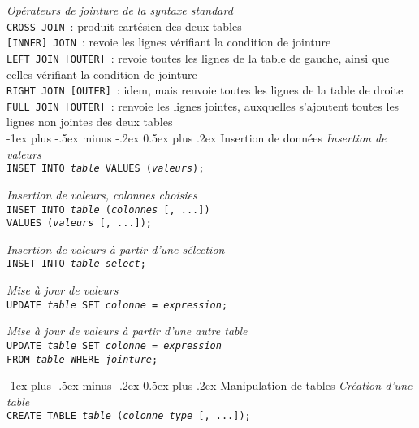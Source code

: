 \documentclass[10pt,landscape, a4paper]{article}
\makeatletter
\renewcommand{\section}{\@startsection{section}{1}{0mm}%
                                {-1ex plus -.5ex minus -.2ex}%
                                {0.5ex plus .2ex}%
                                {\normalfont\large\bfseries}}
\makeatother
\begin{document}
\begin{multicols}{3}
\hspace{0.25em} {\scriptsize \emph{Opérateurs de jointure de la syntaxe standard}} \\
\texttt{CROSS JOIN}~: produit cartésien des deux tables\\ 
\texttt{[INNER] JOIN}~: revoie les lignes vérifiant la condition de jointure\\
\texttt{LEFT JOIN [OUTER]}~: revoie toutes les lignes de la table de gauche, ainsi que celles vérifiant la condition de jointure\\
\texttt{RIGHT JOIN [OUTER]}~: idem, mais renvoie toutes les lignes de la table de droite\\
 \texttt{FULL JOIN [OUTER]}~: renvoie les lignes jointes, auxquelles s'ajoutent toutes les lignes non jointes des deux tables\\
 
\section{Insertion de données}
 \hspace{0.25em} {\scriptsize \emph{Insertion de valeurs}} \\
\texttt{INSET INTO \emph{table} VALUES (\emph{valeurs});}

 \hspace{0.25em} {\scriptsize \emph{Insertion de valeurs, colonnes  choisies}} \\
\texttt{INSET INTO \emph{table} (\emph{colonnes} [, ...]) \\ VALUES (\emph{valeurs} [, ...]);}

 \hspace{0.25em} {\scriptsize \emph{Insertion de valeurs à partir d'une sélection}} \\
\texttt{INSET INTO \emph{table} \emph{select};}

 \hspace{0.25em} {\scriptsize \emph{Mise à jour de valeurs}} \\
\texttt{UPDATE \emph{table} SET \emph{colonne} = \emph{expression};}

 \hspace{0.25em} {\scriptsize \emph{Mise à jour de valeurs à partir d'une autre table}} \\
\texttt{UPDATE \emph{table} SET \emph{colonne} = \emph{expression} \\FROM \emph{table} WHERE \emph{jointure};}

\section{Manipulation de tables}
 \hspace{0.25em} {\scriptsize \emph{Création d'une table}} \\
\texttt{CREATE TABLE \emph{table} (\emph{colonne type} [, ...]);}


\end{multicols}
\end{document}
